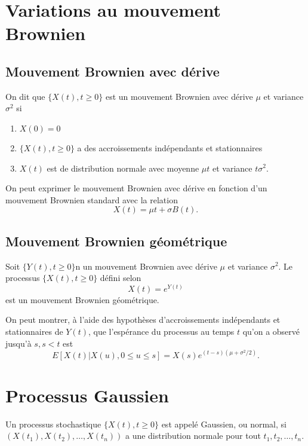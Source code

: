 \section{Variations au mouvement Brownien}

\subsection{Mouvement Brownien avec dérive}

\begin{definition}{}{}
	On dit que $\{X(t), t\geq 0\}$ est un mouvement Brownien avec dérive $\mu$ et variance $\sigma^2$ si 
	\begin{enumerate}
		\item $X(0) = 0$
		\item $\{X(t), t \geq 0\}$ a des accroissements indépendants et stationnaires
		\item $X(t)$ est de distribution normale avec moyenne $\mu t$ et variance $t \sigma^2$. 
	\end{enumerate}
	On peut exprimer le mouvement Brownien avec dérive en fonction d'un mouvement Brownien standard avec la relation 
	$$X(t) = \mu t + \sigma B(t).$$
\end{definition}

\subsection{Mouvement Brownien géométrique}

\begin{definition}{}{}
	Soit $\{Y(t), t\geq 0\}$n un mouvement Brownien avec dérive $\mu$ et variance $\sigma^2$. Le processus $\{X(t), t \geq 0\}$ défini selon $$X(t) = e^{Y(t)}$$
	est un mouvement Brownien géométrique. 
\end{definition}
On peut montrer, à l'aide des hypothèses d'accroissements indépendants et stationnaires de $Y(t)$, que l'espérance du processus au temps $t$ qu'on a observé jusqu'à $s, s<t$ est 
$$E[X(t) \vert X(u), 0\leq u \leq s] = X(s) e^{(t-s)(\mu + \sigma^2/2)}.$$

\section{Processus Gaussien}

\begin{definition}{}{}
	Un processus stochastique $\{X(t), t\geq 0\}$ est appelé Gaussien, ou normal, si $\left(X(t_1), X(t_2), \dots, X(t_n)\right)$ a une distribution normale pour tout $t_1, t_2, \dots, t_n$.
\end{definition}

